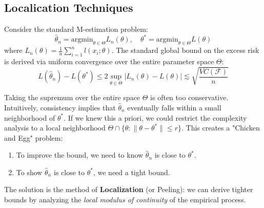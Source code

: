 \subsection{Localication Techniques}
Consider the standard M-estimation problem:
$$
\hat{\theta}_n = \text{argmin}_{\theta \in \Theta} L_n(\theta), \quad \theta^* = \text{argmin}_{\theta \in \Theta} L(\theta)
$$
where $L_n(\theta) = \frac{1}{n}\sum_{i=1}^n l(x_i;\theta)$.
The standard global bound on the excess risk is derived via uniform convergence over the entire parameter space $\Theta$:
$$
L(\hat{\theta}_n) - L(\theta^*) \le 2 \sup_{\theta \in \Theta} |L_n(\theta) - L(\theta)| \lesssim \sqrt{\frac{VC(\mathcal{F})}{n}}
$$
\begin{remark}
    Taking the supremum over the entire space $\Theta$ is often too conservative. Intuitively, consistency implies that $\hat{\theta}_n$ eventually falls within a small neighborhood of $\theta^*$. If we knew this a priori, we could restrict the complexity analysis to a local neighborhood $\Theta \cap \{\theta : \|\theta - \theta^*\| \le r\}$. This creates a "Chicken and Egg" problem:
\begin{enumerate}
    \item To improve the bound, we need to know $\hat{\theta}_n$ is close to $\theta^*$.
    \item To show $\hat{\theta}_n$ is close to $\theta^*$, we need a tight bound.
\end{enumerate}
\end{remark}

 
The solution is the method of \textbf{Localization} (or Peeling): we can derive tighter bounds by analyzing the \textit{local modulus of continuity} of the empirical process.

